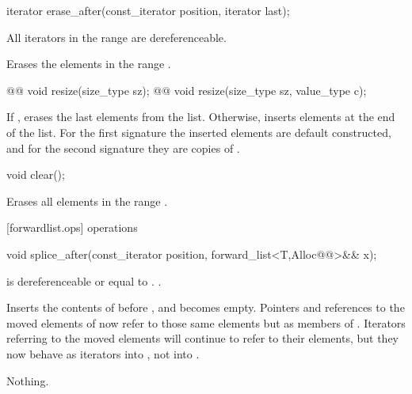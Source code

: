 \documentclass[american,twoside]{book}
\begin{document}
\begin{itemdecl}
iterator erase_after(const_iterator position, iterator last);
\end{itemdecl}

\begin{itemdescr}
\pnum
\requires All iterators in the range  are dereferenceable.

\pnum
\effects Erases the elements in the range .

\pnum
\returns {}
\end{itemdescr}

\begin{itemdecl}
@@ void resize(size_type sz);
@@ void resize(size_type sz, value_type c);
\end{itemdecl}

\begin{itemdescr}
\pnum
\effects If , erases the last  elements from the list. Otherwise, inserts  elements at the end of the list. For the first signature the inserted elements are default constructed, and for the second signature they are copies of .
\end{itemdescr}

\begin{itemdecl}
void clear();
\end{itemdecl}

\begin{itemdescr}
\pnum
\effects Erases all elements in the range .
\end{itemdescr}

[forwardlist.ops]{ operations}

\begin{itemdecl}
void splice_after(const_iterator position, forward_list<T,Alloc@@>&& x);
\end{itemdecl}

\begin{itemdescr}
\pnum
\requires {} is dereferenceable or equal to . .

\pnum
\effects Inserts the contents of  before , and  becomes empty. Pointers and references to the moved elements of  now refer to those same elements but as members of . Iterators referring to the moved elements will continue to refer to their elements, but they now behave as iterators into , not into .

\pnum
\throws Nothing.

\pnum
\complexity {}
\end{itemdescr}
\end{document}
